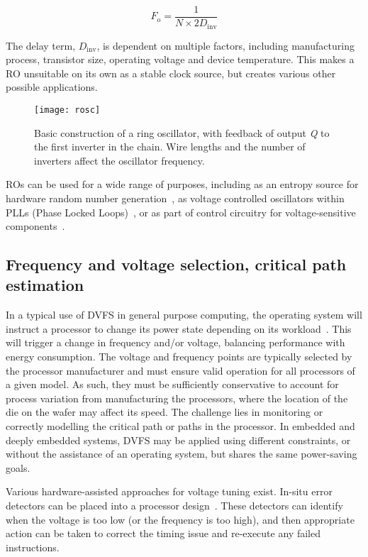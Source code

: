 \documentclass[a4paper,twocolumn,DIV=16]{scrartcl}
\begin{document}
\begin{equation}
F_{\text{o}} = \frac{1}{N \times 2D_{\text{inv}}}
\label{eq:rospeed}
\end{equation}

The delay term, $D_{\text{inv}}$, is dependent on multiple factors, including
manufacturing process, transistor size, operating voltage and device
temperature. This makes a RO unsuitable on its own as a stable clock source,
but creates various other possible applications.

\begin{figure}[]
\centering
\texttt{[image: rosc]}
\caption{Basic construction of a ring oscillator, with feedback of output
\emph{Q} to the first inverter in the chain. Wire lengths and the number of
inverters affect the oscillator frequency.}
\label{fig:RO}
\end{figure}

ROs can be used for a wide range of purposes, including as an entropy source for
hardware random number generation~\cite{XMOS2010a}, as voltage controlled
oscillators within PLLs (Phase Locked Loops)~\cite{Weigandt1994}, or as part of
control circuitry for voltage-sensitive components~\cite{burd2000scaled}.

\subsection{Frequency and voltage selection, critical path estimation}

In a typical use of DVFS in general purpose computing, the operating system will
instruct a processor to change its power state depending on its
workload~\cite{linuxgov2013}. This will trigger a change in frequency and/or
voltage, balancing performance with energy consumption. The voltage and
frequency points are typically selected by the processor manufacturer and must
ensure valid operation for all processors of a given model. As such, they must
be sufficiently conservative to account for process variation from manufacturing
the processors, where the location of the die on the wafer may affect its speed.
The challenge lies in monitoring or correctly modelling the critical path or
paths in the processor. In embedded and deeply embedded systems, DVFS may be
applied using different constraints, or without the assistance of an operating
system, but shares the same power-saving goals.

Various hardware-assisted approaches for voltage tuning exist. In-situ error
detectors can be placed into a processor design~\cite{das2006dvstuning}. These
detectors can identify when the voltage is too low (or the frequency is too
high), and then appropriate action can be taken to correct the timing issue and
re-execute any failed instructions.
\end{document}
